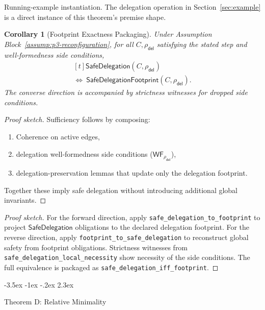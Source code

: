 \documentclass[a4paper,10pt,twocolumn,english]{article}
\makeatletter
\renewcommand{\section}{\@startsection{section}{1}{\z@}%
  {-3.5ex \@plus -1ex \@minus -.2ex}%
  {2.3ex}%
  {\raggedright\normalfont\large\bfseries}}
\numberwithin{equation}{section}
\theoremstyle{paperdef}
\theoremstyle{paperplain}
\newtheorem{corollary}[definition]{Corollary}
\theoremstyle{paperdef}
\theoremstyle{paperremark}
\theoremstyle{paperdef}
\makeatother
\begin{document}
Running-example instantiation. The delegation operation in
Section~\ref{sec:example} is a direct instance of this theorem's premise shape.

\begin{corollary}[Footprint Exactness Packaging]
	\label{cor:footprint}
	Under Assumption Block~\ref{assump:p3-reconfiguration}, for all $C,\rho_{\mathsf{del}}$ satisfying the stated step and well-formedness side conditions,
	\begin{equation}
		\begin{aligned}[t]
			\mathsf{SafeDelegation}(C,\rho_{\mathsf{del}})
			\\
			\iff\ \mathsf{SafeDelegationFootprint}(C,\rho_{\mathsf{del}}).
		\end{aligned}
	\end{equation}
	The converse direction is accompanied by strictness witnesses for dropped side conditions.
\end{corollary}

\begin{proof}[Proof sketch]
	Sufficiency follows by composing:
	\begin{enumerate}
		\item Coherence on active edges,
		\item delegation well-formedness side conditions ($\mathsf{WF}_{\rho_{\mathsf{del}}}$),
		\item delegation-preservation lemmas that update only the delegation footprint.
	\end{enumerate}
	Together these imply safe delegation without introducing additional global invariants.
\end{proof}

\begin{proof}[Proof sketch]
	For the forward direction, apply \nolinkurl{safe_delegation_to_footprint} to project $\mathsf{SafeDelegation}$ obligations to the declared delegation footprint. For the reverse direction, apply \nolinkurl{footprint_to_safe_delegation} to reconstruct global safety from footprint obligations. Strictness witnesses from \nolinkurl{safe_delegation_local_necessity} show necessity of the side conditions. The full equivalence is packaged as \nolinkurl{safe_delegation_iff_footprint}.
\end{proof}

\section{Theorem D: Relative Minimality}
\label{sec:theorem-d}
\end{document}
